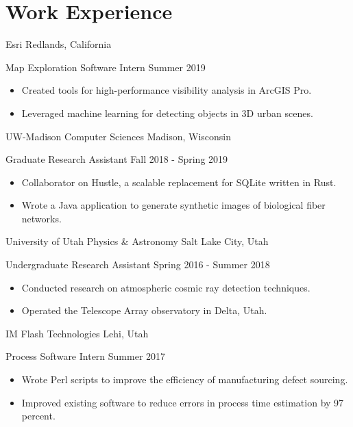 \section*{Work Experience}

\begin{tab1} Esri \> Redlands, California \end{tab1}
\begin{tab2} Map Exploration Software Intern \> Summer 2019 \end{tab2}
\begin{itemize}
    \item Created tools for high-performance visibility analysis in ArcGIS Pro.
    \item Leveraged machine learning for detecting objects in 3D urban scenes.
\end{itemize}

\blockskip

\begin{tab1} UW-Madison Computer Sciences \> Madison, Wisconsin \end{tab1}
\begin{tab2} Graduate Research Assistant \> Fall 2018 - Spring 2019 \end{tab2}
\begin{itemize}
    \item Collaborator on Hustle, a scalable replacement for SQLite written in Rust.
    \item Wrote a Java application to generate synthetic images of biological fiber networks.
\end{itemize}

\blockskip

\begin{tab1} University of Utah Physics \& Astronomy \> Salt Lake City, Utah \end{tab1}
\begin{tab2} Undergraduate Research Assistant \> Spring 2016 - Summer 2018 \end{tab2}
\begin{itemize}
    \item Conducted research on atmospheric cosmic ray detection techniques.
    \item Operated the Telescope Array observatory in Delta, Utah.
\end{itemize}

\blockskip

\begin{tab1} IM Flash Technologies \> Lehi, Utah \end{tab1}
\begin{tab2} Process Software Intern \> Summer 2017 \end{tab2}
\begin{itemize}
    \item Wrote Perl scripts to improve the efficiency of manufacturing defect sourcing.
    \item Improved existing software to reduce errors in process time estimation by 97 percent.
\end{itemize}

